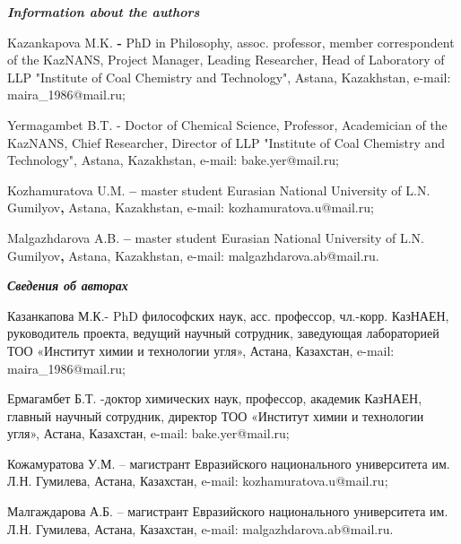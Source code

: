 \emph{{\bfseries Information about the authors}}

\begin{noparindent}
Kazankapova M.K. {\bfseries -} PhD in Philosophy, assoc. professor, member
correspondent of the KazNANS, Project Manager, Leading Researcher, Head
of Laboratory of LLP "Institute of Coal Chemistry and Technology",
Astana, Kazakhstan, e-mail: maira\_1986@mail.ru;

Yermagambet B.T. - Doctor of Chemical Science, Professor, Academician of
the KazNANS, Chief Researcher, Director of LLP "Institute of Coal
Chemistry and Technology", Astana, Kazakhstan, e-mail: bake.yer@mail.ru;

Kozhamuratova U.M. {\bfseries --} master student Eurasian National
University of L.N. Gumilyov{\bfseries ,} Astana, Kazakhstan, e-mail:
kozhamuratova.u@mail.ru;

Malgazhdarova A.B. {\bfseries --} master student Eurasian National
University of L.N. Gumilyov{\bfseries ,} Astana, Kazakhstan, e-mail:
malgazhdarova.ab@mail.ru.
\end{noparindent}

\emph{{\bfseries Сведения об авторах}}

\begin{noparindent}
Казанкапова М.К.- PhD философских наук, асс. профессор, чл.-корр.
КазНАЕН, руководитель проекта, ведущий научный сотрудник, заведующая
лабораторией ТОО «Институт химии и технологии угля», Астана, Казахстан,
e-mail: maira\_1986@mail.ru;

Ермагамбет Б.Т. -доктор химических наук, профессор, академик КазНАЕН,
главный научный сотрудник, директор ТОО «Институт химии и технологии
угля», Астана, Казахстан, e-mail: bake.yer@mail.ru;

Кожамуратова У.М. -- магистрант Евразийского национального университета
им. Л.Н. Гумилева, Астана, Казахстан, e-mail: kozhamuratova.u@mail.ru;

Малгаждарова А.Б. -- магистрант Евразийского национального университета
им. Л.Н. Гумилева, Астана, Казахстан, e-mail: malgazhdarova.ab@mail.ru.
\end{noparindent}
